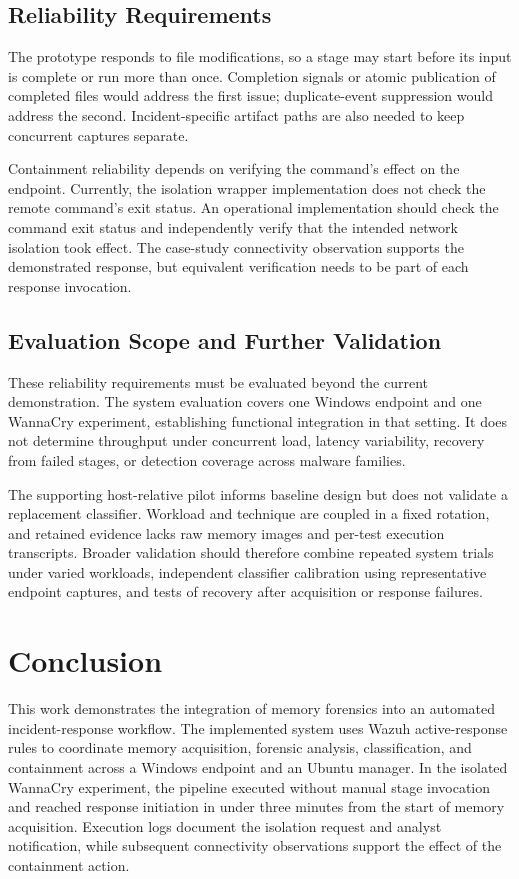 \documentclass[conference]{IEEEtran}
\begin{document}
\subsection{Reliability Requirements}
The prototype responds to file modifications, so a stage may start before its input is complete or run more than once. Completion signals or atomic publication of completed files would address the first issue; duplicate-event suppression would address the second. Incident-specific artifact paths are also needed to keep concurrent captures separate.

Containment reliability depends on verifying the command's effect on the endpoint. Currently, the isolation wrapper implementation does not check the remote command's exit status. An operational implementation should check the command exit status and independently verify that the intended network isolation took effect. The case-study connectivity observation supports the demonstrated response, but equivalent verification needs to be part of each response invocation.

\subsection{Evaluation Scope and Further Validation}
These reliability requirements must be evaluated beyond the current demonstration. The system evaluation covers one Windows endpoint and one WannaCry experiment, establishing functional integration in that setting. It does not determine throughput under concurrent load, latency variability, recovery from failed stages, or detection coverage across malware families.

The supporting host-relative pilot informs baseline design but does not validate a replacement classifier. Workload and technique are coupled in a fixed rotation, and retained evidence lacks raw memory images and per-test execution transcripts. Broader validation should therefore combine repeated system trials under varied workloads, independent classifier calibration using representative endpoint captures, and tests of recovery after acquisition or response failures.


\section{Conclusion}

This work demonstrates the integration of memory forensics into an automated incident-response workflow. The implemented system uses Wazuh active-response rules to coordinate memory acquisition, forensic analysis, classification, and containment across a Windows endpoint and an Ubuntu manager. In the isolated WannaCry experiment, the pipeline executed without manual stage invocation and reached response initiation in under three minutes from the start of memory acquisition. Execution logs document the isolation request and analyst notification, while subsequent connectivity observations support the effect of the containment action.
\end{document}
